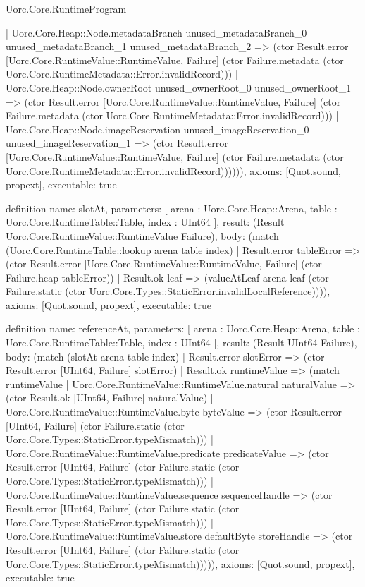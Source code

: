 \begin{lexlean}{Uorc.Core.RuntimeProgram}
\begin{semanticmodule}
{      | Uorc.Core.Heap::Node.metadataBranch unused_metadataBranch_0 unused_metadataBranch_1 unused_metadataBranch_2 => (ctor Result.error [Uorc.Core.RuntimeValue::RuntimeValue, Failure] (ctor Failure.metadata (ctor Uorc.Core.RuntimeMetadata::Error.invalidRecord)))
      | Uorc.Core.Heap::Node.ownerRoot unused_ownerRoot_0 unused_ownerRoot_1 => (ctor Result.error [Uorc.Core.RuntimeValue::RuntimeValue, Failure] (ctor Failure.metadata (ctor Uorc.Core.RuntimeMetadata::Error.invalidRecord)))
      | Uorc.Core.Heap::Node.imageReservation unused_imageReservation_0 unused_imageReservation_1 => (ctor Result.error [Uorc.Core.RuntimeValue::RuntimeValue, Failure] (ctor Failure.metadata (ctor Uorc.Core.RuntimeMetadata::Error.invalidRecord)))))),
  axioms: [Quot.sound, propext],
  executable: true
}

definition{
  name: slotAt,
  parameters: [
    arena : Uorc.Core.Heap::Arena,
    table : Uorc.Core.RuntimeTable::Table,
    index : UInt64
  ],
  result: (Result Uorc.Core.RuntimeValue::RuntimeValue Failure),
  body: (match (Uorc.Core.RuntimeTable::lookup arena table index)
    | Result.error tableError => (ctor Result.error [Uorc.Core.RuntimeValue::RuntimeValue, Failure] (ctor Failure.heap tableError))
    | Result.ok leaf => (valueAtLeaf arena leaf (ctor Failure.static (ctor Uorc.Core.Types::StaticError.invalidLocalReference)))),
  axioms: [Quot.sound, propext],
  executable: true
}

definition{
  name: referenceAt,
  parameters: [
    arena : Uorc.Core.Heap::Arena,
    table : Uorc.Core.RuntimeTable::Table,
    index : UInt64
  ],
  result: (Result UInt64 Failure),
  body: (match (slotAt arena table index)
    | Result.error slotError => (ctor Result.error [UInt64, Failure] slotError)
    | Result.ok runtimeValue => (match runtimeValue
      | Uorc.Core.RuntimeValue::RuntimeValue.natural naturalValue => (ctor Result.ok [UInt64, Failure] naturalValue)
      | Uorc.Core.RuntimeValue::RuntimeValue.byte byteValue => (ctor Result.error [UInt64, Failure] (ctor Failure.static (ctor Uorc.Core.Types::StaticError.typeMismatch)))
      | Uorc.Core.RuntimeValue::RuntimeValue.predicate predicateValue => (ctor Result.error [UInt64, Failure] (ctor Failure.static (ctor Uorc.Core.Types::StaticError.typeMismatch)))
      | Uorc.Core.RuntimeValue::RuntimeValue.sequence sequenceHandle => (ctor Result.error [UInt64, Failure] (ctor Failure.static (ctor Uorc.Core.Types::StaticError.typeMismatch)))
      | Uorc.Core.RuntimeValue::RuntimeValue.store defaultByte storeHandle => (ctor Result.error [UInt64, Failure] (ctor Failure.static (ctor Uorc.Core.Types::StaticError.typeMismatch))))),
  axioms: [Quot.sound, propext],
  executable: true
}


\end{semanticmodule}
\end{lexlean}
